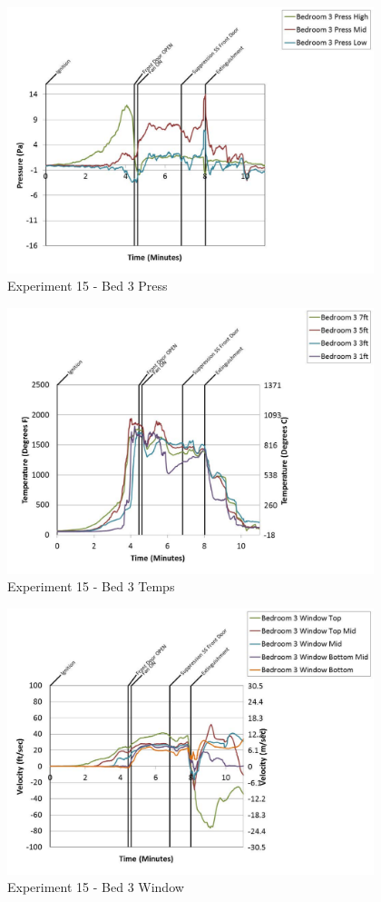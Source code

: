 \documentclass{article}
\begin{document}
\begin{appendices}
	\begin{figure}[h!]
		\centering
		\includegraphics[height=3.05in]{0_Images/Results_Charts/Exp_15_Charts/Bed3Press.pdf}
		\caption{Experiment 15 - Bed 3 Press}
	\end{figure}
 
	\clearpage

	\begin{figure}[h!]
		\centering
		\includegraphics[height=3.05in]{0_Images/Results_Charts/Exp_15_Charts/Bed3Temps.pdf}
		\caption{Experiment 15 - Bed 3 Temps}
	\end{figure}
 

	\begin{figure}[h!]
		\centering
		\includegraphics[height=3.05in]{0_Images/Results_Charts/Exp_15_Charts/Bed3Window.pdf}
		\caption{Experiment 15 - Bed 3 Window}
	\end{figure}
 

\end{appendices}
\end{document}
